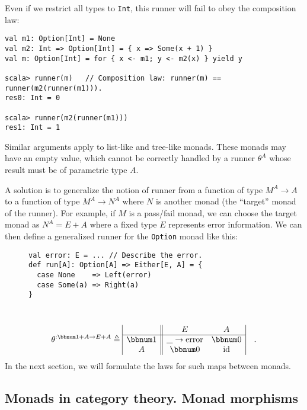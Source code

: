 Even if we restrict all types to \lstinline!Int!, this runner will
fail to obey the composition law:
\begin{lstlisting}
val m1: Option[Int] = None
val m2: Int => Option[Int] = { x => Some(x + 1) }
val m: Option[Int] = for { x <- m1; y <- m2(x) } yield y

scala> runner(m)   // Composition law: runner(m) == runner(m2(runner(m1))).
res0: Int = 0

scala> runner(m2(runner(m1)))
res1: Int = 1
\end{lstlisting}
Similar arguments apply to list-like and tree-like monads. These monads
may have an empty value, which cannot be correctly handled by a runner
$\theta^{A}$ whose result must be of parametric type $A$. 

A solution is to generalize the notion of runner from a function of
type $M^{A}\rightarrow A$ to a function of type $M^{A}\rightarrow N^{A}$
where $N$ is another monad (the \textsf{``}target\textsf{''} monad of the runner).
For example, if $M$ is a pass/fail monad, we can choose the target
monad as $N^{A}=E+A$ where a fixed type $E$ represents error information.
We can then define a generalized runner for the \lstinline!Option!
monad like this:

\begin{wrapfigure}{l}{0.43\columnwidth}%
\vspace{-0.85\baselineskip}

\begin{lstlisting}
val error: E = ... // Describe the error.
def run[A]: Option[A] => Either[E, A] = {
  case None    => Left(error)
  case Some(a) => Right(a)
}
\end{lstlisting}
\vspace{-2.2\baselineskip}
\end{wrapfigure}%

~\vspace{-0.4\baselineskip}
\[
\theta^{:\bbnum 1+A\rightarrow E+A}\triangleq\begin{array}{|c||cc|}
 & E & A\\
\hline \bbnum 1 & \_\rightarrow\text{error} & \bbnum 0\\
A & \bbnum 0 & \text{id}
\end{array}\quad.
\]
In the next section, we will formulate the laws for such maps between
monads.

\subsection{Monads in category theory. Monad morphisms\label{subsec:Monads-in-category-theory-monad-morphisms}}

